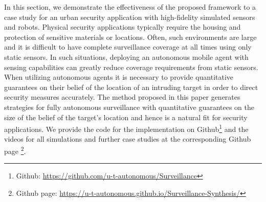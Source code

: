 In this section, we demonstrate the effectiveness of the proposed framework to a case study for an urban security application with high-fidelity simulated sensors and robots. 
Physical security applications typically require the housing and protection of sensitive materials or locations. Often, such environments are large and it is difficult to have complete surveillance coverage at all times using only static sensors. In such situations, deploying an autonomous mobile agent with sensing capabilities can greatly reduce coverage requirements from static sensors. When utilizing autonomous agents it is necessary to provide quantitative guarantees on their belief of the location of an intruding target in order to direct security measures accurately. The method proposed in this paper generates strategies for fully autonomous surveillance with quantitative guarantees on the size of the belief of the target's location and hence is a natural fit for security applications. 
We provide the code for the implementation on Github\footnote{Github: \url{https://github.com/u-t-autonomous/Surveillance}} and the videos for all simulations and further case studies at the corresponding Github page \footnote{Github page: \url{https://u-t-autonomous.github.io/Surveillance-Synthesis/}}.



